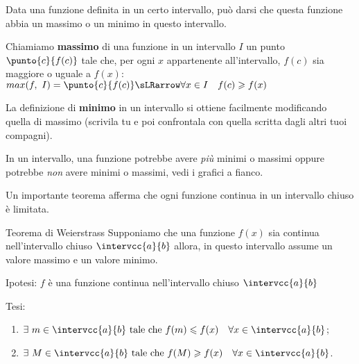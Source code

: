 Data una funzione definita in un certo intervallo, può darsi che questa 
funzione abbia un massimo o un minimo in questo intervallo.

\begin{newdef}{}{}
 Chiamiamo \textbf{massimo} di una funzione in un intervallo \(I\) un punto 
\(\punto{c}{f(c)}\) tale che, per ogni \(x\) appartenente all'intervallo, 
\(f(c)\) sia maggiore o uguale a \(f(x)\): \qquad
\(max(f,~I) = \punto{c}{f(c)} \sLRarrow \forall x \in I \quad
f(c) \geqslant f(x)\)
\end{newdef}

\begin{minipage}{.25\textwidth}
La definizione di \textbf{minimo} in un intervallo si ottiene facilmente 
modificando quella di massimo (scrivila tu e poi confrontala con quella 
scritta dagli altri tuoi compagni).

In un intervallo, una funzione potrebbe avere \emph{più} minimi o massimi 
oppure potrebbe \emph{non} avere minimi o massimi, vedi i grafici a fianco.
\end{minipage}
\hfill
\begin{minipage}{.68\textwidth}
\begin{center} \contsinusoide \end{center}
\begin{center} \costante \contiperbole \end{center}
\end{minipage}

Un importante teorema afferma che ogni funzione continua in un intervallo 
chiuso è limitata.


\begin{newtheo}{Teorema di Weierstrass}{}
Supponiamo che una funzione \(f(x)\) sia continua nell'intervallo chiuso
\(\intervcc{a}{b}\) allora, in questo intervallo assume un valore massimo e 
un valore minimo.
\end{newtheo}


\noindent Ipotesi: \quad 
\(f\) è una funzione continua nell'intervallo chiuso \(\intervcc{a}{b}\)

\noindent Tesi: 
\begin{enumerate}[nosep]
 \item \(\exists~m \in \intervcc{a}{b} \text{ tale che }
         f(m) \leqslant f(x) \quad \forall x \in \intervcc{a}{b}\);
 \item \(\exists~M \in \intervcc{a}{b} \text{ tale che }
         f(M) \geqslant f(x) \quad \forall x \in \intervcc{a}{b}\).
\end{enumerate}

